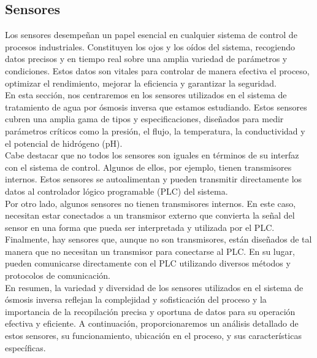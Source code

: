 

\subsection{Sensores}

Los sensores desempeñan un papel esencial en cualquier sistema de control de procesos industriales. 
Constituyen los ojos y los oídos del sistema, recogiendo datos precisos y en tiempo real sobre una amplia variedad de 
parámetros y condiciones. Estos datos son vitales para controlar de manera efectiva el proceso, optimizar el rendimiento, 
mejorar la eficiencia y garantizar la seguridad.\\

En esta sección, nos centraremos en los sensores utilizados en el sistema de tratamiento de agua por ósmosis inversa que 
estamos estudiando. Estos sensores cubren una amplia gama de tipos y especificaciones, diseñados para medir parámetros 
críticos como la presión, el flujo, la temperatura, la conductividad y el potencial de hidrógeno (pH).\\

Cabe destacar que no todos los sensores son iguales en términos de su interfaz con el sistema de control. Algunos de ellos,
 por ejemplo, tienen transmisores internos. Estos sensores se autoalimentan y pueden transmitir directamente los datos al 
 controlador lógico programable (PLC) del sistema.\\

Por otro lado, algunos sensores no tienen transmisores internos. En este caso, necesitan estar conectados a un transmisor 
externo que convierta la señal del sensor en una forma que pueda ser interpretada y utilizada por el PLC.\\

Finalmente, hay sensores que, aunque no son transmisores, están diseñados de tal manera que no necesitan un transmisor para 
conectarse al PLC. En su lugar, pueden comunicarse directamente con el PLC utilizando diversos métodos y protocolos de 
comunicación.\\

En resumen, la variedad y diversidad de los sensores utilizados en el sistema de ósmosis inversa reflejan la complejidad 
y sofisticación del proceso y la importancia de la recopilación precisa y oportuna de datos para su operación efectiva 
y eficiente. A continuación, proporcionaremos un análisis detallado de estos sensores, su funcionamiento, ubicación 
en el proceso, y sus características específicas.\\


